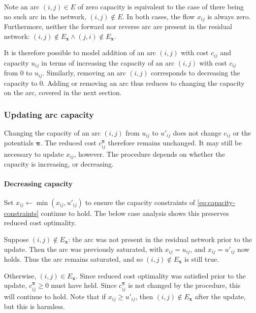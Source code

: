 Note an arc $(i,j) \in E$ of zero capacity is equivalent to the case of there being no such arc in the network, $(i,j) \not \in E$. In both cases, the flow $x_{ij}$ is always zero. Furthermore, neither the forward nor reverse arc are present in the residual network: $(i,j) \not \in E_\mathbf{x} \land (j,i) \not \in E_\mathbf{x}$.

It is therefore possible to model addition of an arc $(i,j)$ with cost $c_{ij}$ and capacity $u_{ij}$ in terms of increasing the capacity of an arc $(i,j)$ with cost $c_{ij}$ from $0$ to $u_{ij}$. Similarly, removing an arc $(i,j)$ corresponds to decreasing the capacity to $0$. Adding or removing an arc thus reduces to changing the capacity on the arc, covered in the next section.

\subsubsection{Updating arc capacity}

Changing the capacity of an arc $(i,j)$ from $u_{ij}$ to $u'_{ij}$ does not change $c_{ij}$ or the potentials $\boldsymbol{\pi}$. The reduced cost $c_{ij}^{\boldsymbol{\pi}}$ therefore remains unchanged. It may still be necessary to update $x_{ij}$, however. The procedure depends on whether the capacity is increasing, or decreasing.

\paragraph{Decreasing capacity}
Set $x_{ij} \gets \min\left(x_{ij},u'_{ij}\right)$ to ensure the capacity constraints of \cref{eq:capacity-constraints} continue to hold\footnotemark. The below case analysis shows this preserves reduced cost optimality.

Suppose $(i,j) \not \in E_\mathbf{x}$: the arc was not present in the residual network prior to the update. Then the arc was previously saturated, with $x_{ij} = u_{ij}$, and $x_{ij} = u'_{ij}$ now holds. Thus the arc remains saturated, and so $(i,j) \not \in E_\mathbf{x}$ is still true.

Otherwise, $(i,j) \in E_\mathbf{x}$. Since reduced cost optimality was satisfied prior to the update, $c_{ij}^{\boldsymbol{\pi}} \geq 0$ must have held. Since $c_{ij}^{\boldsymbol{\pi}}$ is not changed by the procedure, this will continue to hold. Note that if $x_{ij} \geq u'_{ij}$, then $(i,j) \not \in E_\mathbf{x}$ after the update, but this is harmless.

